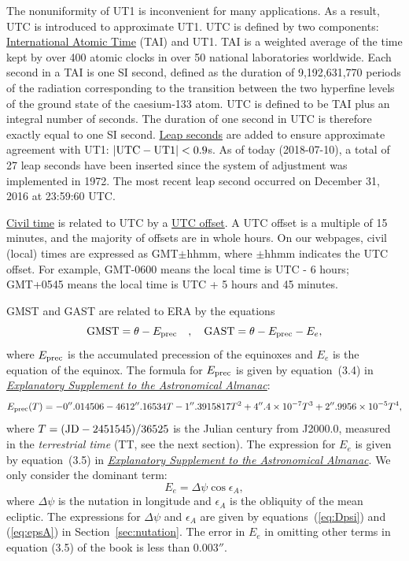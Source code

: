 \documentclass[12pt]{article}
\newcommand \beq {\begin{equation}}
\newcommand \eeq {\end{equation}}
\newcommand{\expl}{\href{http://www.uscibooks.com/urban.htm}{\it Explanatory Supplement to the Astronomical Almanac}}
\begin{document}
The nonuniformity of UT1 is inconvenient for many applications. As a result, 
UTC is introduced to approximate UT1. UTC is defined by two components: 
\href{https://en.wikipedia.org/wiki/International_Atomic_Time}{International 
Atomic Time} (TAI) and UT1. TAI is a weighted average of the time kept by 
over 400 atomic clocks in over 50 national laboratories worldwide. Each second 
in a TAI is one SI second, defined as the duration of 9,192,631,770 periods of 
the radiation corresponding to the transition between the two hyperfine 
levels of the ground state of the caesium-133 atom. UTC is defined to be 
TAI plus an integral number of seconds. The duration of one second in UTC 
is therefore exactly equal to one SI second. \href{https://en.wikipedia.org/wiki/Leap_second}
{Leap seconds} are added to ensure approximate agreement with UT1: $|{\rm UTC-UT1}|<0.9$s. 
As of today (2018-07-10), a total of 27 leap seconds have been inserted since the 
system of adjustment was implemented in 1972. The most recent leap second occurred 
on December 31, 2016 at 23:59:60 UTC.

\href{https://en.wikipedia.org/wiki/Civil_time}{\rm Civil time} is related to 
UTC by a \href{https://en.wikipedia.org/wiki/UTC_offset}{UTC offset}. A UTC 
offset is a multiple of 15 minutes, and the majority of offsets are in whole 
hours. On our webpages, civil (local) times are expressed as GMT$\pm$hhmm, where 
$\pm$hhmm indicates the UTC offset. For example, GMT-0600 means the local time 
is UTC - 6 hours; GMT+0545 means the local time is UTC + 5 hours and 45 minutes.

GMST and GAST are related to ERA by the equations 
\beq
  {\rm GMST} = \theta - E_{\rm prec} \ \ \ , \ \ \ {\rm GAST} = \theta - E_{\rm prec} - E_e ,
\label{eq:GST}
\eeq
where $E_{\rm prec}$ is the accumulated precession of the equinoxes and $E_e$ is 
the equation of the equinox. The formula for $E_{\rm prec}$ is given by 
equation~(3.4) in \expl:
\beq
  E_{\rm prec}(T) = -0''.014506 - 4612''.16534 T - 1''.3915817 T^2 
+ 4''.4\times 10^{-7} T^3 + 2''.9956\times 10^{-5} T^4 ,
\label{eq:Eprec}
\eeq
where $T= ({\rm JD} - 2451545)/36525$ is the Julian century from J2000.0, measured in 
the {\em terrestrial time} (TT, see the next section). The expression for 
$E_e$ is given by equation~(3.5) in \expl. We only consider the dominant term:
\beq
  E_e = \Delta \psi \cos \epsilon_A ,
\label{eq:Ee}
\eeq
where $\Delta \psi$ is the nutation in longitude and $\epsilon_A$ is the obliquity 
of the mean ecliptic. The expressions for $\Delta \psi$ and $\epsilon_A$ are given 
by equations~(\ref{eq:Dpsi}) and (\ref{eq:epsA}) in Section~\ref{sec:nutation}. 
The error in $E_e$ in omitting other terms in equation (3.5) of the book is 
less than $0.003''$.
\end{document}

